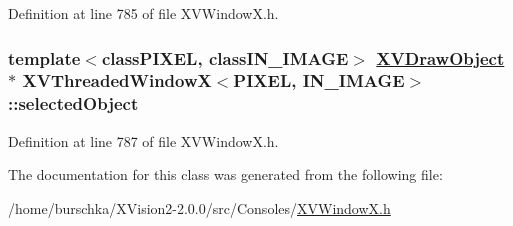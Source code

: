 Definition at line 785 of file XVWindow\-X.h.\label{XVThreadedWindowX_n6}
\hypertarget{class_XVThreadedWindowX_n6}{
\subsubsection[selectedObject]{\setlength{\rightskip}{0pt plus 5cm}template$<$classPIXEL, classIN\_\-IMAGE$>$ \hyperlink{class_XVDrawObject}{XVDraw\-Object} $\ast$ XVThreaded\-Window\-X$<$PIXEL, IN\_\-IMAGE$>$::selected\-Object}}




Definition at line 787 of file XVWindow\-X.h.

The documentation for this class was generated from the following file:\begin{CompactItemize}
\item 
/home/burschka/XVision2-2.0.0/src/Consoles/\hyperlink{XVWindowX.h-source}{XVWindow\-X.h}\end{CompactItemize}
